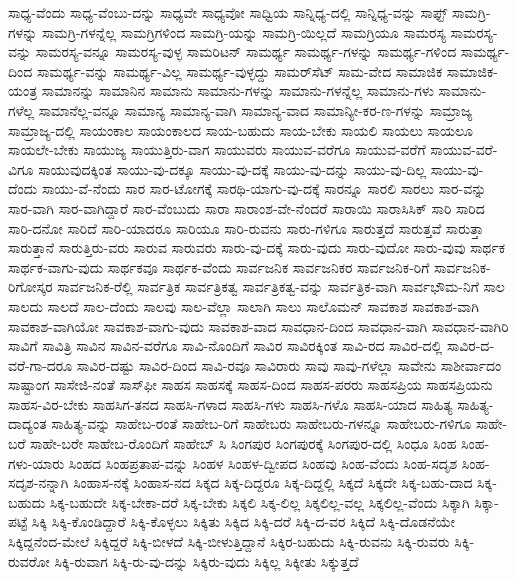 {ಸಾಧ್ಯ-ವೆಂದು
ಸಾಧ್ಯ-ವೆಂಬು-ದನ್ನು
ಸಾಧ್ಯವೇ
ಸಾಧ್ಯವೋ
ಸಾಧ್ವಿಯ
ಸಾನ್ನಿಧ್ಯ-ದಲ್ಲಿ
ಸಾನ್ನಿಧ್ಯ-ವನ್ನು
ಸಾಫ್ಟ್
ಸಾಮಗ್ರಿ-ಗಳನ್ನು
ಸಾಮಗ್ರಿ-ಗಳನ್ನೆಲ್ಲ
ಸಾಮಗ್ರಿಗಳಿಂದ
ಸಾಮಗ್ರಿ-ಯನ್ನು
ಸಾಮಗ್ರಿ-ಯಿಲ್ಲದೆ
ಸಾಮಗ್ರಿಯೂ
ಸಾಮರಸ್ಯ
ಸಾಮರಸ್ಯ-ವನ್ನು
ಸಾಮರಸ್ಯ-ವನ್ನೂ
ಸಾಮರಸ್ಯ-ವುಳ್ಳ
ಸಾಮರಿಟನ್
ಸಾಮರ್ಥ್ಯ
ಸಾಮರ್ಥ್ಯ-ಗಳನ್ನು
ಸಾಮರ್ಥ್ಯ-ಗಳಿಂದ
ಸಾಮರ್ಥ್ಯ-ದಿಂದ
ಸಾಮರ್ಥ್ಯ-ವನ್ನು
ಸಾಮರ್ಥ್ಯ-ವಿಲ್ಲ
ಸಾಮರ್ಥ್ಯ-ವುಳ್ಳದ್ದು
ಸಾಮರ್‌ಸೆಟ್
ಸಾಮ-ವೇದ
ಸಾಮಾಜಿಕ
ಸಾಮಾಜಿಕ-ಯಂತ್ರ
ಸಾಮಾನನ್ನು
ಸಾಮಾನಿನ
ಸಾಮಾನು
ಸಾಮಾನು-ಗಳನ್ನು
ಸಾಮಾನು-ಗಳನ್ನೆಲ್ಲ
ಸಾಮಾನು-ಗಳು
ಸಾಮಾನು-ಗಳೆಲ್ಲ
ಸಾಮಾನೆಲ್ಲ-ವನ್ನೂ
ಸಾಮಾನ್ಯ
ಸಾಮಾನ್ಯ-ವಾಗಿ
ಸಾಮಾನ್ಯ-ವಾದ
ಸಾಮಾನ್ಯೀ-ಕರ-ಣ-ಗಳನ್ನು
ಸಾಮ್ರಾಜ್ಯ
ಸಾಮ್ರಾಜ್ಯ-ದಲ್ಲಿ
ಸಾಯಂಕಾಲ
ಸಾಯಂಕಾಲದ
ಸಾಯ-ಬಹುದು
ಸಾಯ-ಬೇಕು
ಸಾಯಲಿ
ಸಾಯಲು
ಸಾಯಲೂ
ಸಾಯಲೇ-ಬೇಕು
ಸಾಯುಜ್ಯ
ಸಾಯುತ್ತಿರು-ವಾಗ
ಸಾಯುವರು
ಸಾಯುವ-ವರೆಗೂ
ಸಾಯುವ-ವರೆಗೆ
ಸಾಯುವ-ವರೆ-ವಿಗೂ
ಸಾಯುವುದಕ್ಕಿಂತ
ಸಾಯು-ವು-ದಕ್ಕೂ
ಸಾಯು-ವು-ದಕ್ಕೆ
ಸಾಯು-ವು-ದನ್ನು
ಸಾಯು-ವು-ದಿಲ್ಲ
ಸಾಯು-ವು-ದೆಂದು
ಸಾಯು-ವೆ-ನೆಂದು
ಸಾರ
ಸಾರ-ಟೋಗಕ್ಕೆ
ಸಾರಥಿ-ಯಾಗು-ವು-ದಕ್ಕೆ
ಸಾರನ್ನೂ
ಸಾರಲಿ
ಸಾರಲು
ಸಾರ-ವನ್ನು
ಸಾರ-ವಾಗಿ
ಸಾರ-ವಾಗಿದ್ದಾರೆ
ಸಾರ-ವೆಂಬುದು
ಸಾರಾ
ಸಾರಾಂಶ-ವೇ-ನೆಂದರೆ
ಸಾರಾಯಿ
ಸಾರಾಸಿಸಿಕ್
ಸಾರಿ
ಸಾರಿದ
ಸಾರಿ-ದನೋ
ಸಾರಿದೆ
ಸಾರಿ-ಯಾದರೂ
ಸಾರಿಯೂ
ಸಾರಿ-ರುವನು
ಸಾರು-ಗಳಿಗೂ
ಸಾರುತ್ತದೆ
ಸಾರುತ್ತವೆ
ಸಾರುತ್ತಾ
ಸಾರುತ್ತಾನೆ
ಸಾರುತ್ತಿರು-ವರು
ಸಾರುವ
ಸಾರುವರು
ಸಾರು-ವು-ದಕ್ಕೆ
ಸಾರು-ವುದು
ಸಾರು-ವುದೋ
ಸಾರು-ವುವು
ಸಾರ್ಥಕ
ಸಾರ್ಥಕ-ವಾಗು-ವುದು
ಸಾರ್ಥಕವೂ
ಸಾರ್ಥಕ-ವೆಂದು
ಸಾರ್ವಜನಿಕ
ಸಾರ್ವಜನಿಕರ
ಸಾರ್ವಜನಿಕ-ರಿಗೆ
ಸಾರ್ವಜನಿಕ-ರಿಗೋಸ್ಕರ
ಸಾರ್ವಜನಿಕ-ರೆಲ್ಲಿ
ಸಾರ್ವತ್ರಿಕ
ಸಾರ್ವತ್ರಿಕತ್ವ
ಸಾರ್ವತ್ರಿಕತ್ವ-ವನ್ನು
ಸಾರ್ವತ್ರಿಕ-ವಾಗಿ
ಸಾರ್ವಭೌಮ-ನಿಗೆ
ಸಾಲ
ಸಾಲದು
ಸಾಲದೆ
ಸಾಲ-ದೆಂದು
ಸಾಲವು
ಸಾಲ-ವೆಲ್ಲಾ
ಸಾಲಾಗಿ
ಸಾಲು
ಸಾಲೊಮನ್
ಸಾವಕಾಶ
ಸಾವಕಾಶ-ವಾಗಿ
ಸಾವಕಾಶ-ವಾಗಿಯೋ
ಸಾವಕಾಶ-ವಾಗು-ವುದು
ಸಾವಕಾಶ-ವಾದ
ಸಾವಧಾನ-ದಿಂದ
ಸಾವಧಾನ-ವಾಗಿ
ಸಾವಧಾನ-ವಾಗಿರಿ
ಸಾವಿಗೆ
ಸಾವಿತ್ರಿ
ಸಾವಿನ
ಸಾವಿನ-ವರೆಗೂ
ಸಾವಿ-ನೊಂದಿಗೆ
ಸಾವಿರ
ಸಾವಿರಕ್ಕಿಂತ
ಸಾವಿ-ರದ
ಸಾವಿರ-ದಲ್ಲಿ
ಸಾವಿರ-ದ-ವರೆ-ಗಾ-ದರೂ
ಸಾವಿರ-ದಷ್ಟು
ಸಾವಿರ-ದಿಂದ
ಸಾವಿ-ರವೂ
ಸಾವಿರಾರು
ಸಾವು
ಸಾವು-ಗಳೆಲ್ಲಾ
ಸಾವೇನು
ಸಾಶೀರ್ವಾದಂ
ಸಾಷ್ಟಾಂಗ
ಸಾಸೇಜಿ-ನಂತೆ
ಸಾಸ್‌ಫೀ
ಸಾಹಸ
ಸಾಹಸಕ್ಕೆ
ಸಾಹಸ-ದಿಂದ
ಸಾಹಸ-ಪರರು
ಸಾಹಸಪ್ರಿಯ
ಸಾಹಸಪ್ರಿಯನು
ಸಾಹಸ-ವಿರ-ಬೇಕು
ಸಾಹಸಿಗ-ತನದ
ಸಾಹಸಿ-ಗಳಾದ
ಸಾಹಸಿ-ಗಳು
ಸಾಹಸಿ-ಗಳೊ
ಸಾಹಸಿ-ಯಾದ
ಸಾಹಿತ್ಯ
ಸಾಹಿತ್ಯ-ದಾದ್ಯಂತ
ಸಾಹಿತ್ಯ-ವನ್ನು
ಸಾಹೇಬ-ರಂತೆ
ಸಾಹೇಬ-ರಿಗೆ
ಸಾಹೇಬರು
ಸಾಹೇಬರು-ಗಳನ್ನೂ
ಸಾಹೇಬರು-ಗಳಿಗೂ
ಸಾಹೇ-ಬರೆ
ಸಾಹೇ-ಬರೇ
ಸಾಹೇಬ-ರೊಂದಿಗೆ
ಸಾಹೇಬ್
ಸಿ
ಸಿಂಗಪುರ
ಸಿಂಗಪುರಕ್ಕೆ
ಸಿಂಗಪುರ-ದಲ್ಲಿ
ಸಿಂಧೂ
ಸಿಂಹ
ಸಿಂಹ-ಗಳು-ಯಾರು
ಸಿಂಹದ
ಸಿಂಹಪ್ರತಾಪ-ವನ್ನು
ಸಿಂಹಳ
ಸಿಂಹಳ-ದ್ವೀಪದ
ಸಿಂಹವು
ಸಿಂಹ-ವೆಂದು
ಸಿಂಹ-ಸದೃಶ
ಸಿಂಹ-ಸದೃಶ-ನನ್ನಾಗಿ
ಸಿಂಹಾಸ-ನಕ್ಕೆ
ಸಿಂಹಾಸ-ನದ
ಸಿಕ್ಕದ
ಸಿಕ್ಕ-ದಿದ್ದರೂ
ಸಿಕ್ಕ-ದಿದ್ದಲ್ಲಿ
ಸಿಕ್ಕದೆ
ಸಿಕ್ಕದೇ
ಸಿಕ್ಕ-ಬಹು-ದಾದ
ಸಿಕ್ಕ-ಬಹುದು
ಸಿಕ್ಕ-ಬಹುದೇ
ಸಿಕ್ಕ-ಬೇಕಾ-ದರೆ
ಸಿಕ್ಕ-ಬೇಕು
ಸಿಕ್ಕಲಿ
ಸಿಕ್ಕ-ಲಿಲ್ಲ
ಸಿಕ್ಕಲಿಲ್ಲ-ವಲ್ಲ
ಸಿಕ್ಕಲಿಲ್ಲ-ವೆಂದು
ಸಿಕ್ಕಾಗಿ
ಸಿಕ್ಕಾ-ಪಟ್ಟೆ
ಸಿಕ್ಕಿ
ಸಿಕ್ಕಿ-ಕೊಂಡಿದ್ದಾರೆ
ಸಿಕ್ಕಿ-ಕೊಳ್ಳಲು
ಸಿಕ್ಕಿತು
ಸಿಕ್ಕಿದ
ಸಿಕ್ಕಿ-ದರೆ
ಸಿಕ್ಕಿ-ದ-ವರ
ಸಿಕ್ಕಿದೆ
ಸಿಕ್ಕಿ-ದೊಡನೆಯೇ
ಸಿಕ್ಕಿದ್ದನೆಂದ-ಮೇಲೆ
ಸಿಕ್ಕಿದ್ದರೆ
ಸಿಕ್ಕಿ-ಬೀಳದೆ
ಸಿಕ್ಕಿ-ಬೀಳುತ್ತಿದ್ದಾನೆ
ಸಿಕ್ಕಿರ-ಬಹುದು
ಸಿಕ್ಕಿ-ರುವನು
ಸಿಕ್ಕಿ-ರುವರು
ಸಿಕ್ಕಿ-ರುವರೋ
ಸಿಕ್ಕಿ-ರುವಾಗ
ಸಿಕ್ಕಿ-ರು-ವು-ದನ್ನು
ಸಿಕ್ಕಿರು-ವುದು
ಸಿಕ್ಕಿಲ್ಲ
ಸಿಕ್ಕೀತು
ಸಿಕ್ಕುತ್ತದೆ
}
